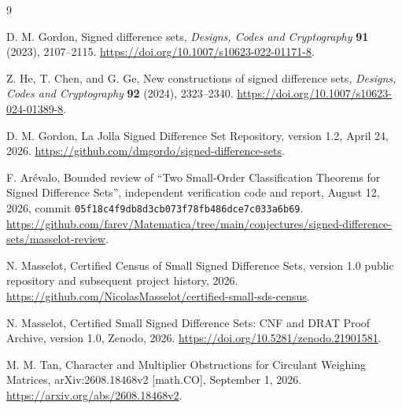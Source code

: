 \documentclass[11pt]{article}
\theoremstyle{remark}
\begin{document}
\begin{thebibliography}{9}

D. M. Gordon,
\newblock Signed difference sets,
\newblock \emph{Designs, Codes and Cryptography} \textbf{91} (2023),
2107--2115.
\newblock \url{https://doi.org/10.1007/s10623-022-01171-8}.

Z. He, T. Chen, and G. Ge,
\newblock New constructions of signed difference sets,
\newblock \emph{Designs, Codes and Cryptography} \textbf{92} (2024),
2323--2340.
\newblock \url{https://doi.org/10.1007/s10623-024-01389-8}.

D. M. Gordon,
\newblock La Jolla Signed Difference Set Repository, version 1.2,
April 24, 2026.
\newblock \url{https://github.com/dmgordo/signed-difference-sets}.

F. Ar\'evalo,
\newblock Bounded review of ``Two Small-Order Classification Theorems for
Signed Difference Sets'',
\newblock independent verification code and report, August 12, 2026,
commit \texttt{05f18c4f9db8d3cb073f78fb486dce7c033a6b69}.
\newblock \url{https://github.com/farev/Matematica/tree/main/conjectures/signed-difference-sets/masselot-review}.

N. Masselot,
\newblock Certified Census of Small Signed Difference Sets,
version 1.0 public repository and subsequent project history, 2026.
\newblock \url{https://github.com/NicolasMasselot/certified-small-sds-census}.

N. Masselot,
\newblock Certified Small Signed Difference Sets: CNF and DRAT Proof Archive,
version 1.0, Zenodo, 2026.
\newblock \url{https://doi.org/10.5281/zenodo.21901581}.

M. M. Tan,
\newblock Character and Multiplier Obstructions for Circulant Weighing
Matrices,
\newblock arXiv:2608.18468v2 [math.CO], September 1, 2026.
\newblock \url{https://arxiv.org/abs/2608.18468v2}.

\end{thebibliography}
\end{document}
